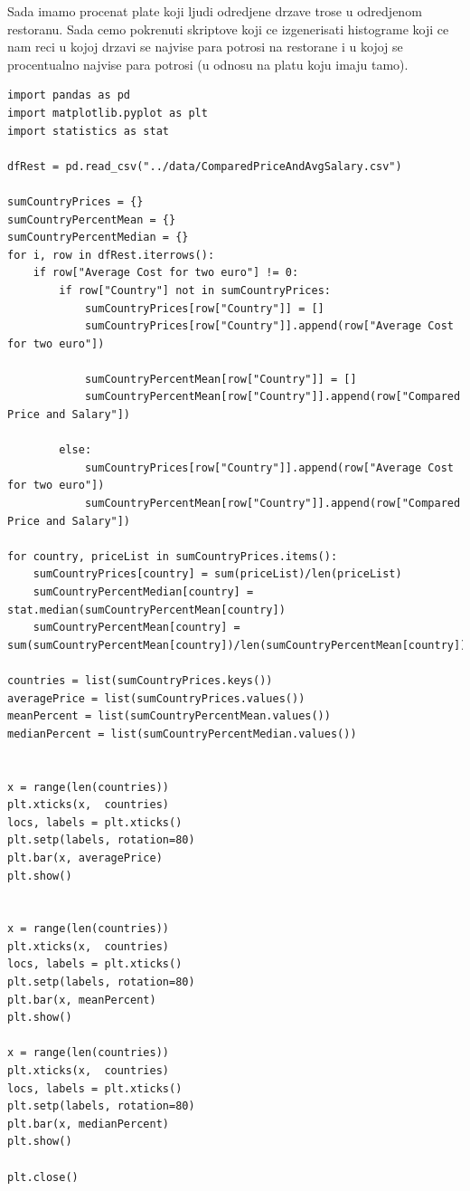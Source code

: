 \documentclass[11pt]{article} %
\begin{document}
Sada imamo procenat plate koji ljudi odredjene drzave trose u odredjenom restoranu. Sada cemo pokrenuti skriptove koji ce izgenerisati histograme koji ce nam reci
u kojoj drzavi se najvise para potrosi na restorane i u kojoj se procentualno najvise para potrosi (u odnosu na platu koju imaju tamo). 
\begin{lstlisting}
import pandas as pd
import matplotlib.pyplot as plt
import statistics as stat

dfRest = pd.read_csv("../data/ComparedPriceAndAvgSalary.csv")

sumCountryPrices = {}
sumCountryPercentMean = {}
sumCountryPercentMedian = {}
for i, row in dfRest.iterrows():
    if row["Average Cost for two euro"] != 0:
        if row["Country"] not in sumCountryPrices:
            sumCountryPrices[row["Country"]] = []
            sumCountryPrices[row["Country"]].append(row["Average Cost for two euro"])
            
            sumCountryPercentMean[row["Country"]] = []
            sumCountryPercentMean[row["Country"]].append(row["Compared Price and Salary"])
            
        else:
            sumCountryPrices[row["Country"]].append(row["Average Cost for two euro"])
            sumCountryPercentMean[row["Country"]].append(row["Compared Price and Salary"])
        
for country, priceList in sumCountryPrices.items():
    sumCountryPrices[country] = sum(priceList)/len(priceList)
    sumCountryPercentMedian[country] = stat.median(sumCountryPercentMean[country])
    sumCountryPercentMean[country] = sum(sumCountryPercentMean[country])/len(sumCountryPercentMean[country])
    
countries = list(sumCountryPrices.keys())
averagePrice = list(sumCountryPrices.values())
meanPercent = list(sumCountryPercentMean.values())
medianPercent = list(sumCountryPercentMedian.values())


x = range(len(countries))
plt.xticks(x,  countries)
locs, labels = plt.xticks()
plt.setp(labels, rotation=80)
plt.bar(x, averagePrice)
plt.show()


x = range(len(countries))
plt.xticks(x,  countries)
locs, labels = plt.xticks()
plt.setp(labels, rotation=80)
plt.bar(x, meanPercent)
plt.show()

x = range(len(countries))
plt.xticks(x,  countries)
locs, labels = plt.xticks()
plt.setp(labels, rotation=80)
plt.bar(x, medianPercent)
plt.show()

plt.close()
\end{lstlisting}
\end{document}
